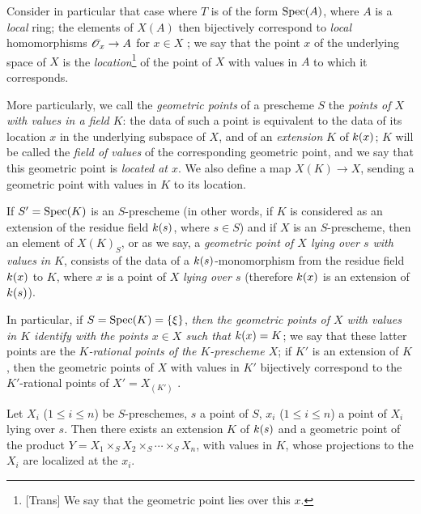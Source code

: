 \begin{env}[3.4.5]
\label{1.3.4.5}
Consider in particular that case where $T$ is of the form ${\mathop{\mathrm{Spec}}\nolimits}(A)$, where $A$ is a
\emph{local} ring; the elements of $X(A)$ then bijectively correspond to \emph{local}
homomorphisms $\OO_x\to A$ for $x\in X$ ; we say that the
point $x$ of the underlying space of $X$ is the \emph{location}\footnote{[Trans] We say that
the geometric point lies over this $x$.} of the point of $X$ with values in $A$ to which it
corresponds.

More particularly, we call the \emph{geometric points} of a prescheme $S$ the \emph{points of
$X$ with values in a field $K$}: the data of such a point is equivalent to the data of its
location $x$ in the underlying subspace of $X$, and of an \emph{extension} $K$ of $k(x)$;
$K$ will be called the \emph{field of values} of the corresponding geometric point, and we
say that this geometric point is \emph{located at $x$}. We also define a map $X(K)\to X$,
sending a geometric point with values in $K$ to its location.

If $S'={\mathop{\mathrm{Spec}}\nolimits}(K)$ is an $S$-prescheme (in other words, if $K$ is considered as an extension
of the residue field $k(s)$, where $s\in S$) and if $X$ is an $S$-prescheme, then an
element of $X(K)_S$, or as we say, a \emph{geometric point of $X$ lying over $s$ with values
in $K$}, consists of the data of a $k(s)$-monomorphism from the residue field $k(x)$
to $K$, where $x$ is a point of $X$ \emph{lying over $s$} (therefore $k(x)$ is an
extension of $k(s)$).

In particular, if $S={\mathop{\mathrm{Spec}}\nolimits}(K)=\{\xi\}$, \emph{then the geometric points of $X$ with values in
$K$ identify with the points $x\in X$ such that $k(x)=K$}; we say that these latter
points are the \emph{$K$-rational points of the $K$-prescheme $X$}; if $K'$ is an extension
of $K$, then the geometric points of $X$ with values in $K'$ bijectively correspond to the
$K'$-rational points of $X'=X_{(K')}$ .
\end{env}

\begin{lem}[3.4.6]
\label{1.3.4.6}
Let $X_i$ ($1\leqslant i\leqslant n$) be $S$-preschemes, $s$ a point of $S$, $x_i$
($1\leqslant i\leqslant n$) a point of $X_i$ lying over $s$. Then there exists an extension
$K$ of $k(s)$ and a geometric point of the product
$Y=X_1\times_S X_2\times_S\cdots\times_S X_n$, with values in $K$, whose projections to
the $X_i$ are localized at the $x_i$.
\end{lem}

